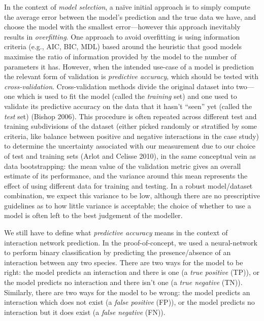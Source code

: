 \documentclass[11pt]{article}
\begin{document}
In the context of \emph{model selection}, a naïve initial approach is to
simply compute the average error between the model's prediction and the
true data we have, and choose the model with the smallest
error---however this approach inevitably results in \emph{overfitting}.
One approach to avoid overfitting is using information criteria (e.g.,
AIC, BIC, MDL) based around the heuristic that good models maximise the
ratio of information provided by the model to the number of parameters
it has. However, when the intended use-case of a model is prediction the
relevant form of validation is \emph{predictive accuracy}, which should
be tested with \emph{cross-validation}. Cross-validation methods divide
the original dataset into two---one which is used to fit the model
(called the \emph{training} set) and one used to validate its predictive
accuracy on the data that it hasn't ``seen'' yet (called the \emph{test}
set) (Bishop 2006). This procedure is often repeated across different
test and training subdivisions of the dataset (either picked randomly or
stratified by some criteria, like balance between positive and negative
interactions in the case study) to determine the uncertainty associated
with our measurement due to our choice of test and training sets (Arlot
and Celisse 2010), in the same conceptual vein as data bootstrapping:
the mean value of the validation metric gives an overall estimate of its
performance, and the variance around this mean represents the effect of
using different data for training and testing. In a robust model/dataset
combination, we expect this variance to be low, although there are no
prescriptive guidelines as to how little variance is acceptable; the
choice of whether to use a model is often left to the best judgement of
the modeller.

We still have to define what \emph{predictive accuracy} means in the
context of interaction network prediction. In the proof-of-concept, we
used a neural-network to perform binary classification by predicting the
presence/absence of an interaction between any two species. There are
two ways for the model to be right: the model predicts an interaction
and there is one (a \emph{true positive} (TP)), or the model predicts no
interaction and there isn't one (a \emph{true negative} (TN)).
Similarly, there are two ways for the model to be wrong: the model
predicts an interaction which does not exist (a \emph{false positive}
(FP)), or the model predicts no interaction but it does exist (a
\emph{false negative} (FN)).
\end{document}
